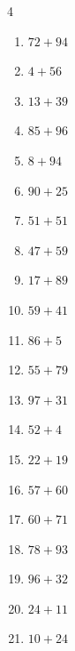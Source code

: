 \begin{multicols}{4}
\begin{enumerate}
  \item $72+94$
        \phantom{$=166$}

  \item $4+56$
        \phantom{$=60$}

  \item $13+39$
        \phantom{$=52$}

  \item $85+96$
        \phantom{$=181$}

  \item $8+94$
        \phantom{$=102$}

  \item $90+25$
        \phantom{$=115$}

  \item $51+51$
        \phantom{$=102$}

  \item $47+59$
        \phantom{$=106$}

  \item $17+89$
        \phantom{$=106$}

  \item $59+41$
        \phantom{$=100$}

  \item $86+5$
        \phantom{$=91$}

  \item $55+79$
        \phantom{$=134$}

\columnbreak %

\resetques

  \item $97+31$
        \phantom{$=128$}

  \item $52+4$
        \phantom{$=56$}

  \item $22+19$
        \phantom{$=41$}

  \item $57+60$
        \phantom{$=117$}

  \item $60+71$
        \phantom{$=131$}

  \item $78+93$
        \phantom{$=171$}

  \item $96+32$
        \phantom{$=128$}

  \item $24+11$
        \phantom{$=35$}

  \item $10+24$
        \phantom{$=34$}


\end{enumerate}
\end{multicols}
